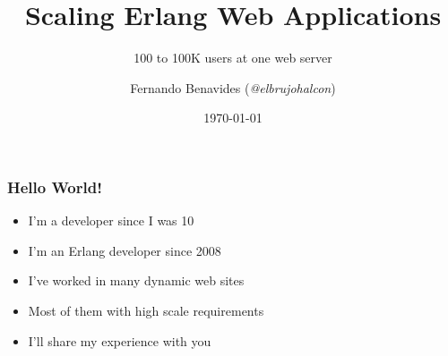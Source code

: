 \documentclass[utf8]{beamer}
\begin{document}
\title{Scaling Erlang Web Applications}
\subtitle{100 to 100K users at one web server}
\author{Fernando Benavides (\textit{@elbrujohalcon})}
\date{\today}


\frame{\titlepage} 

\begin{frame}[t]
	\frametitle{Hello World!}
	\begin{itemize}
		\item<+-> I'm a developer since I was 10
		\item<+-> I'm an Erlang developer since 2008
		\item<+-> I've worked in many dynamic web sites
		\item<+-> Most of them with high scale requirements
		\item<+-> I'll share my experience with you
	\end{itemize}
\end{frame}
\end{document}
